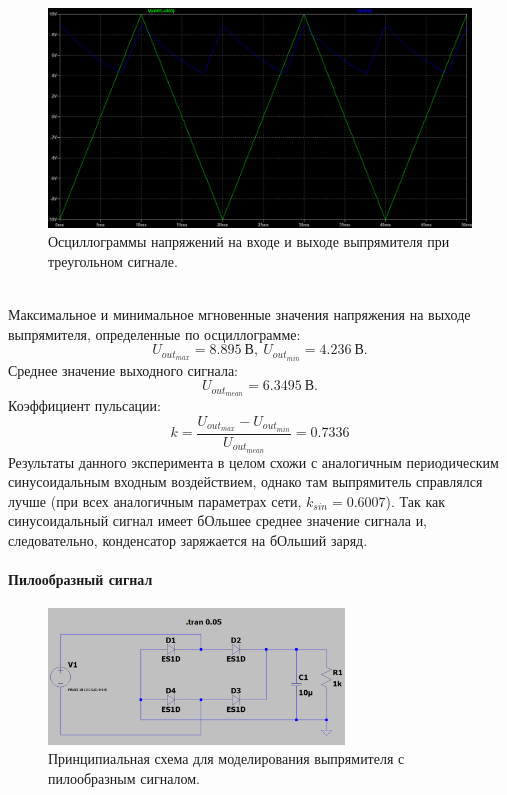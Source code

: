 \documentclass[12pt]{article}
\begin{document}
\begin{figure}[H]
    \centering
    \includegraphics[width=\textwidth]{4_triangular_voltages.png}
    \caption{Осциллограммы напряжений на входе и выходе выпрямителя при треугольном сигнале.}
    \label{fig:4_triangular_voltages.png}
\end{figure}\\

Максимальное и минимальное мгновенные значения напряжения на выходе выпрямителя, определенные по осциллограмме:
\[
U_{out_{max}} = 8.895 \ \text{В}, \ U_{out_{min}} = 4.236 \ \text{В}.
\]
Среднее значение выходного сигнала:
\[
U_{{out}_{mean}} = 6.3495 \ \text{В}.
\]
Коэффициент пульсации:
\[
k = \frac{U_{out_{max}} - U_{out_{min}}}{U_{{out}_{mean}}} = 0.7336
\]
Результаты данного эксперимента в целом схожи с аналогичным периодическим синусоидальным входным воздействием, однако там выпрямитель справлялся лучше (при всех аналогичным параметрах сети, $k_{sin} = 0.6007$). Так как синусоидальный сигнал имеет бОльшее среднее значение сигнала и, следовательно, конденсатор заряжается на бОльший заряд.

\paragraph*{Пилообразный сигнал}

\begin{figure}[H]
    \centering
    \includegraphics[width=0.7\textwidth]{4_saw_signal.png}
    \caption{Принципиальная схема для моделирования выпрямителя с пилообразным сигналом.}
    \label{fig:4_saw_signal.png}
\end{figure}\\
\end{document}
